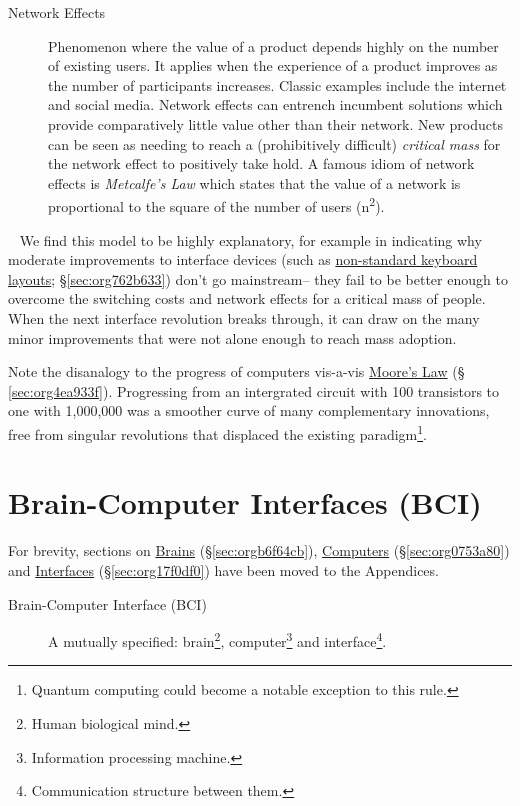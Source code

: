 \documentclass[logo,bsc,singlespacing,parskip]{infthesis}
\begin{document}
\begin{mdframed}
\begin{description}
\item[{Network Effects\label{network effects}}] Phenomenon where the value of a product depends highly on the number of existing users.
It applies when the experience of a product improves as the number of participants increases.
Classic examples include the internet and social media.
Network effects can entrench incumbent solutions which provide comparatively little value other than their network.
New products can be seen as needing to reach a (prohibitively difficult) \emph{critical mass} for the network effect to positively take hold.
A famous idiom of network effects is \emph{Metcalfe's Law} which states that the value of a network is proportional to the square of the number of users (n\textsuperscript{2}).
\end{description}
\end{mdframed}
~
We find this model to be highly explanatory, for example in indicating why moderate improvements to interface devices (such as \hyperref[sec:org762b633]{non-standard keyboard layouts}; \S \ref{sec:org762b633}) don't go mainstream-- they  fail to be better enough to overcome the switching costs and network effects for a critical mass of people.
When the next interface revolution breaks through, it can draw on the many minor improvements that were not alone enough to reach mass adoption.

Note the disanalogy to the progress of computers vis-a-vis \hyperref[sec:org4ea933f]{Moore's Law} (§ \ref{sec:org4ea933f}).
Progressing from an intergrated circuit with 100 transistors to one with 1,000,000 was a smoother curve of many complementary innovations, free from singular revolutions that displaced the existing paradigm\footnote{Quantum computing could become a notable exception to this rule.}.

\chapter{Brain-Computer Interfaces (BCI)}
\label{sec:org56fce65}
For brevity, sections on \hyperref[sec:orgb6f64cb]{Brains} (\S \ref{sec:orgb6f64cb}), \hyperref[sec:org0753a80]{Computers} (\S \ref{sec:org0753a80}) and \hyperref[sec:org17f0df0]{Interfaces} (\S \ref{sec:org17f0df0}) have been moved to the Appendices.

\begin{mdframed}
\begin{description}
\item[{\label{orgeddbcd6}Brain-Computer Interface (BCI)}] A mutually specified: brain\footnote{Human biological mind.}, computer\footnote{Information processing machine.} and interface\footnote{Communication structure between them.}.
\end{description}
\end{mdframed}
\end{document}
